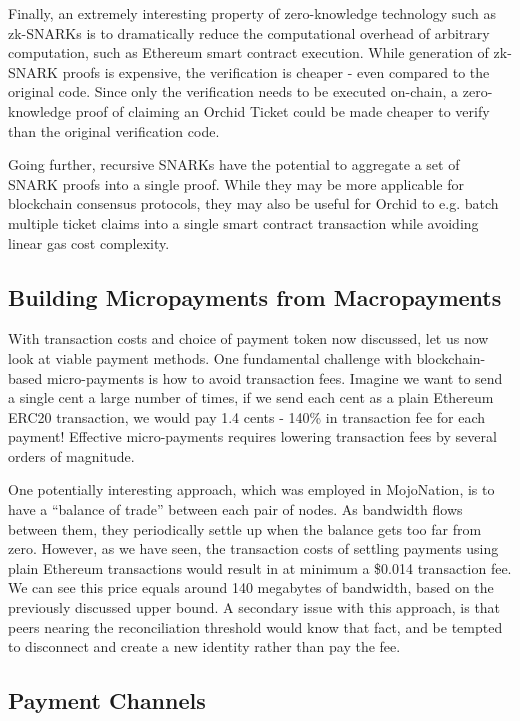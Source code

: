 Finally, an extremely interesting property of zero-knowledge technology such as zk-SNARKs is to dramatically reduce the computational overhead of arbitrary computation, such as Ethereum smart contract execution\cite{zksnarks-blockchain}. While generation of zk-SNARK proofs is expensive, the verification is cheaper - even compared to the original code. Since only the verification needs to be executed on-chain, a zero-knowledge proof of claiming an Orchid Ticket could be made cheaper to verify than the original verification code.

Going further, recursive SNARKs\cite{RecursiveSnarks} have the potential to aggregate a set of SNARK proofs into a single proof. While they may be more applicable for blockchain consensus protocols\cite{ScalingTezos}, they may also be useful for Orchid to e.g. batch multiple ticket claims into a single smart contract transaction while avoiding linear gas cost complexity.

\subsection{Building Micropayments from Macropayments}

With transaction costs and choice of payment token now discussed, let us now look at viable payment methods. One fundamental challenge with blockchain-based micro-payments is how to avoid transaction fees. Imagine we want to send a single cent a large number of times, if we send each cent as a plain Ethereum ERC20 transaction, we would pay 1.4 cents - 140\% in transaction fee for each payment! Effective micro-payments requires lowering transaction fees by several orders of magnitude.

One potentially interesting approach, which was employed in MojoNation\cite{mojonation}, is to have a ``balance of trade'' between each pair of nodes. As bandwidth flows between them, they periodically settle up when the balance gets too far from zero. However, as we have seen, the transaction costs of settling payments using plain Ethereum transactions would result in at minimum a \$0.014 transaction fee. We can see this price equals around 140 megabytes of bandwidth, based on the previously discussed upper bound. A secondary issue with this approach, is that peers nearing the reconciliation threshold would know that fact, and be tempted to disconnect and create a new identity rather than pay the fee.

\subsection{Payment Channels}

